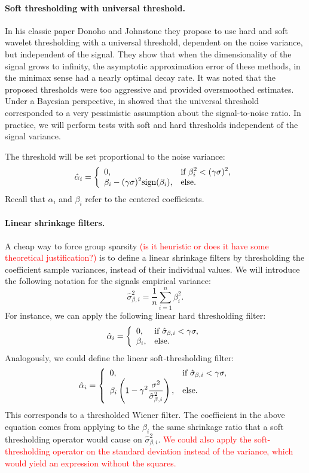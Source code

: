 \documentclass{ipol}
\begin{document}
\paragraph{Soft thresholding with universal threshold.} In his classic paper
Donoho and Johnstone \cite{Donoho1994} they propose to use hard and soft
wavelet thresholding with a universal threshold, dependent on the noise variance,
but independent of the signal. They show that when the dimensionality of the signal 
grows to infinity, the asymptotic approximation error of these methods, in the 
minimax sense had a nearly optimal decay rate. It was noted that the proposed
thresholds were too aggressive and provided oversmoothed estimates. Under a Bayesian 
perspective, in \cite{Moulin1999} showed that the universal threshold corresponded to
a very pessimistic assumption about the signal-to-noise ratio. In practice,
we will perform tests with soft and hard thresholds independent of the signal variance.

The threshold will be set proportional to the noise variance:
\[\hat\alpha_i = \left\{
\begin{array}{l l}
	0,& \displaystyle\text{if }\beta_i^2 < (\gamma\sigma)^2,\\
	\displaystyle\beta_i - (\gamma\sigma)^2\text{sign}(\beta_i),&\text{else.}
\end{array}
\right.\]
Recall that $\alpha_i$ and $\beta_i$ refer to the centered coefficients.

\paragraph{Linear shrinkage filters.} A cheap way to force group sparsity
\textcolor{red}{(is it heuristic or does it have some theoretical
justification?)} is to define a linear shrinkage filters by thresholding
the coefficient sample variances, instead of their individual values.
We will introduce the following notation for the signals empirical variance:
\[\hat \sigma_{\beta,i}^2 = \frac1n\sum_{i=1}^n\beta_i^2.\]
%
For instance, we can apply the following linear hard thresholding filter:
\[\hat\alpha_i = \left\{
\begin{array}{l l}
	0,& \displaystyle\text{if }\hat\sigma_{\beta,i} < \gamma\sigma,\\
	\beta_i,&\text{else.}
\end{array}
\right.\]
Analogously, we could define the linear soft-thresholding filter:
\[\hat\alpha_i = 
	\left\{
\begin{array}{l l}
	0,& \displaystyle\text{if }\hat\sigma_{\beta,i} < \gamma\sigma,\\
	\beta_i\left(\displaystyle1 - \gamma^2\frac{\sigma^2}{\hat\sigma_{\beta,i}^2}\right),&\text{else.}
\end{array}
\right.\]
This corresponds to a thresholded Wiener filter. The coefficient in 
the above equation comes from applying to the $\beta_i$ the same shrinkage ratio
that a soft thresholding operator would cause on $\hat \sigma_{\beta,i}^2$.
\textcolor{red}{We could also apply the soft-thresholding
operator on the standard deviation instead of the variance, which would
yield an expression without the squares.}
\end{document}
